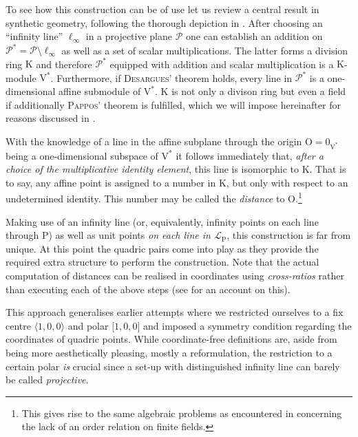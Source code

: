 \documentclass[12pt,english,paper=a4,DIV=12,headings=small,numbers=noenddot,parskip=half]{scrartcl}
\theoremstyle{definition}
\begin{document}
To see how this construction can be of use let us review a central result in synthetic geometry, following the thorough depiction in \cite{Beutelspacher}. After choosing an ``infinity line'' $\ell_\infty$ in a projective plane $\mathscr{P}$ one can establish an addition on $\mathscr{P}^*=\mathscr{P}\setminus\ell_\infty$ as well as a set of scalar multiplications. The latter forms a division ring $\mathrm{K}$ and therefore $\mathscr{P}^*$ equipped with addition and scalar multiplication is a $\mathrm{K}$-module $\mathrm{V}^*$. Furthermore, if \textsc{Desargues}' theorem holds, every line in $\mathscr{P}^*$ is a one-dimensional affine submodule of $\mathrm{V}^*$. $\mathrm{K}$ is not only a divison ring but even a field if additionally \textsc{Pappos}' theorem is fulfilled, which we will impose hereinafter for reasons discussed in \cite{Alex:Th12}.

With the knowledge of a line in the affine subplane through the origin $\mathrm{O}=0_{\mathrm{V}^*}$ being a one-dimensional subspace of $\mathrm{V}^*$ it follows immediately that, \emph{after a choice of the multiplicative identity element}, this line is isomorphic to $\mathrm{K}$. That is to say, any affine point is assigned to a number in $\mathrm{K}$, but only with respect to an undetermined identity. This number may be called the \emph{distance} to $\mathrm{O}$.\footnote{This gives rise to the same algebraic problems as encountered in \cite{AlKr:2013} concerning the lack of an order relation on finite fields.}

Making use of an infinity line (or, equivalently, infinity points on each line through $\mathrm{P}$) as well as unit points \emph{on each line in $\mathscr{L}_\mathrm{P}$}, this construction is far from unique. At this point the quadric pairs come into play as they provide the required extra structure to perform the construction. Note that the actual computation of distances can be realised in coordinates using \emph{cross-ratios} rather than executing each of the above steps (see \cite{AlKr:2013} for an account on this).

This approach generalises earlier attempts where we restricted ourselves to a fix centre $\langle1,0,0\rangle$ and polar $\lbrack1,0,0\rbrack$ and imposed a symmetry condition regarding the coordinates of quadric points. While coordinate-free definitions are, aside from being more aesthetically pleasing, mostly a reformulation, the restriction to a certain polar \emph{is} crucial since a set-up with distinguished infinity line can barely be called \emph{projective}.
\end{document}
